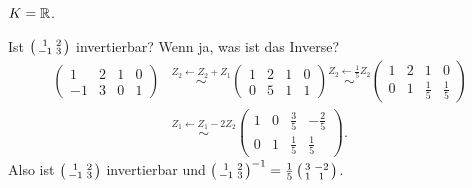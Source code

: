 \documentclass[../../main.tex]{subfiles}
\begin{document}
\begin{bsp}\label{7.3.6}
$K = \mathbb R$.

Ist $\left(\begin{smallmatrix}
1 & 2\\
-1 & 3
\end{smallmatrix}\right)$ invertierbar? Wenn ja, was ist das Inverse?
\begin{align*}
\left(\begin{array}{cc|cc}
1 & 2 & 1 & 0\\
-1 & 3 & 0 & 1
\end{array}\right) & \overset{Z_2 \leftarrow Z_2+ Z_1}{\sim} \left(\begin{array}{cc|cc}
1 & 2 & 1 & 0\\
0 & 5 & 1 & 1
\end{array}\right) \overset{Z_2\leftarrow \frac{1}{5}Z_2}{\sim}\left(\begin{array}{cc|cc}
1 & 2 & 1 & 0\\
0 & 1 & \frac{1}{5} & \frac{1}{5}
\end{array}\right)\\
&\overset{Z_1\leftarrow Z_1-2Z_2}{\sim} \left(\begin{array}{cc|cc}
1 & 0 & \frac{3}{5} & -\frac{2}{5}\\
0 & 1 & \frac{1}{5} & \frac{1}{5}
\end{array}\right).
\end{align*}
Also ist $\left(\begin{smallmatrix}
1 & 2\\
-1 & 3
\end{smallmatrix}\right)$ invertierbar und $\left(\begin{smallmatrix}
1 & 2\\
-1 & 3
\end{smallmatrix}\right)^{-1} = \frac{1}{5}\left(\begin{smallmatrix}
3 & -2\\
1 & 1
\end{smallmatrix}\right)$.
\end{bsp}
\end{document}
